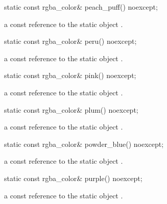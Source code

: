 \begin{itemdecl}
static const rgba_color& peach_puff() noexcept;
\end{itemdecl}
\begin{itemdescr}
\pnum
\returns
a const reference to the static  object .
\end{itemdescr}

\begin{itemdecl}
static const rgba_color& peru() noexcept;
\end{itemdecl}
\begin{itemdescr}
\pnum
\returns
a const reference to the static  object .
\end{itemdescr}

\begin{itemdecl}
static const rgba_color& pink() noexcept;
\end{itemdecl}
\begin{itemdescr}
\pnum
\returns
a const reference to the static  object .
\end{itemdescr}

\begin{itemdecl}
static const rgba_color& plum() noexcept;
\end{itemdecl}
\begin{itemdescr}
\pnum
\returns
a const reference to the static  object .
\end{itemdescr}

\begin{itemdecl}
static const rgba_color& powder_blue() noexcept;
\end{itemdecl}
\begin{itemdescr}
\pnum
\returns
a const reference to the static  object .
\end{itemdescr}

\begin{itemdecl}
static const rgba_color& purple() noexcept;
\end{itemdecl}
\begin{itemdescr}
\pnum
\returns
a const reference to the static  object .
\end{itemdescr}

